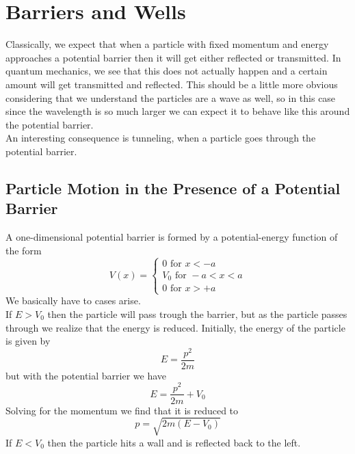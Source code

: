 
\chapter{Barriers and Wells}
	Classically, we expect that when a particle with fixed momentum and energy approaches a potential barrier then it will get either reflected or transmitted. In quantum mechanics, we see that this does not actually happen and a certain amount will get transmitted and reflected. This should be a little more obvious considering that we understand the particles are a wave as well, so in this case since the wavelength is so much larger we can expect it to behave like this around the potential barrier. \\
An interesting consequence is tunneling, when a particle goes through the potential barrier.
\section{Particle Motion in the Presence of a Potential Barrier}
A one-dimensional potential barrier is formed by a potential-energy function of the form
\[ V(x) = \begin{cases}
0 \text{ for } x < -a \\
V_0 \text{ for } -a < x < a \\
0 \text{ for } x > +a 
\end{cases} \]
We basically have to cases arise. \\
If $ E > V_0 $ then the particle will pass trough the barrier, but as the particle passes through we realize that the energy is reduced. Initially, the energy of the particle is given by 
\[ E = \frac{p^2}{2m} \] but with the potential barrier we have \[ E = \frac{p^2}{2m} + V_0\]
Solving for the momentum we find that it is reduced to 
\[ p = \sqrt{2m(E-V_0)} \]
If $ E < V_0 $ then the particle hits a wall and is reflected back to the left. 

